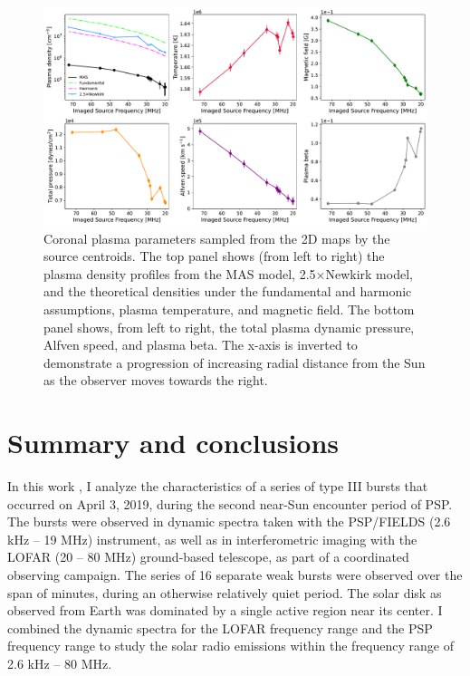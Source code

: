 \begin{figure}[!htp]
\centering
\includegraphics[width=\textwidth]{chapter3/figs/scatterplots_FORWARD_plasma_diagnostics_2019-04-01_4R.pdf}
\caption{Coronal plasma parameters sampled from the 2D maps by the source centroids. The top panel shows (from left to right) the plasma density profiles from the MAS model, 2.5×Newkirk model, and the theoretical densities under the fundamental and harmonic assumptions, plasma temperature, and magnetic field. The bottom panel shows, from left to right, the total plasma dynamic pressure, Alfven speed, and plasma beta. The x-axis is inverted to demonstrate a progression of increasing radial distance from the Sun as the observer moves towards the right.}
\label{scatterplot}
\end{figure}

\section{Summary and conclusions}
\label{sec_ch3_conclusions}
In this work \citep{nedal_lofar_psp_2023}, I analyze the characteristics of a series of type III bursts that occurred on April 3, 2019, during the second near-Sun encounter period of PSP. The bursts were observed in dynamic spectra taken with the PSP/FIELDS (2.6 kHz – 19 MHz) instrument, as well as in interferometric imaging with the LOFAR (20 – 80 MHz) ground-based telescope, as part of a coordinated observing campaign. The series of 16 separate weak bursts were observed over the span of  minutes, during an otherwise relatively quiet period. The solar disk as observed from Earth was dominated by a single active region near its center. I combined the dynamic spectra for the LOFAR frequency range and the PSP frequency range to study the solar radio emissions within the frequency range of 2.6 kHz – 80 MHz. 

